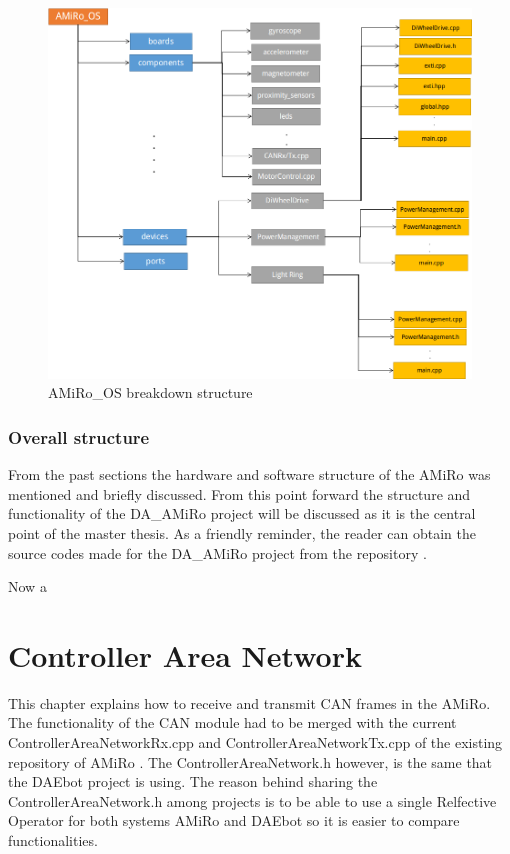\documentclass[12pt]{report}%
\begin{document}
\begin{figure}[ht]
	\centering
	\includegraphics[width=\textwidth]{AMiRo_OS}
    \caption{AMiRo\_OS breakdown structure}
    \label{fig:OS}
\end{figure}


\subsection{Overall structure}
From the past sections the hardware and software structure of the AMiRo was mentioned and briefly discussed. From this point forward the structure and functionality of the DA\_AMiRo project will be discussed as it is the central point of the master thesis. As a friendly reminder, the reader can obtain the source codes made for the DA\_AMiRo project from the repository \cite{AMiRo_Git}.

Now a %

\chapter{Controller Area Network}

This chapter explains how to receive and transmit CAN frames in the AMiRo. The functionality of the CAN module had to be merged with the current ControllerAreaNetworkRx.cpp and ControllerAreaNetworkTx.cpp of the existing repository of AMiRo \cite{AMiRo_Wiki}. The ControllerAreaNetwork.h however, is the same that the DAEbot project is using. The reason behind sharing the ControllerAreaNetwork.h among projects is to be able to use a single Relfective Operator for both systems AMiRo and DAEbot so it is easier to compare functionalities.
\end{document}
